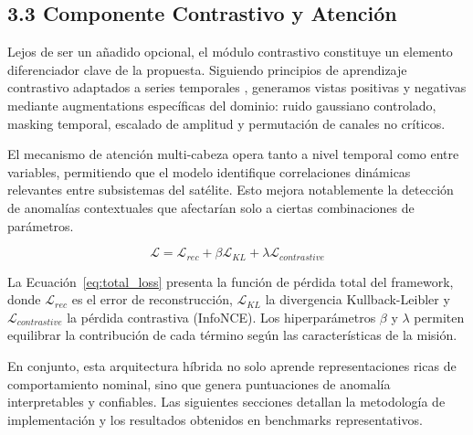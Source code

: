 \subsection{3.3 Componente Contrastivo y Atención}

Lejos de ser un añadido opcional, el módulo contrastivo constituye un elemento diferenciador clave de la propuesta. Siguiendo principios de aprendizaje contrastivo adaptados a series temporales \cite{Wang2025_Contrastive}, generamos vistas positivas y negativas mediante augmentations específicas del dominio: ruido gaussiano controlado, masking temporal, escalado de amplitud y permutación de canales no críticos.

El mecanismo de atención multi-cabeza opera tanto a nivel temporal como entre variables, permitiendo que el modelo identifique correlaciones dinámicas relevantes entre subsistemas del satélite. Esto mejora notablemente la detección de anomalías contextuales que afectarían solo a ciertas combinaciones de parámetros.

\begin{equation}
\mathcal{L} = \mathcal{L}_{rec} + \beta \mathcal{L}_{KL} + \lambda \mathcal{L}_{contrastive}
\label{eq:total_loss}
\end{equation}

La Ecuación~\ref{eq:total_loss} presenta la función de pérdida total del framework, donde \(\mathcal{L}_{rec}\) es el error de reconstrucción, \(\mathcal{L}_{KL}\) la divergencia Kullback-Leibler y \(\mathcal{L}_{contrastive}\) la pérdida contrastiva (InfoNCE). Los hiperparámetros \(\beta\) y \(\lambda\) permiten equilibrar la contribución de cada término según las características de la misión.

En conjunto, esta arquitectura híbrida no solo aprende representaciones ricas de comportamiento nominal, sino que genera puntuaciones de anomalía interpretables y confiables. Las siguientes secciones detallan la metodología de implementación y los resultados obtenidos en benchmarks representativos.